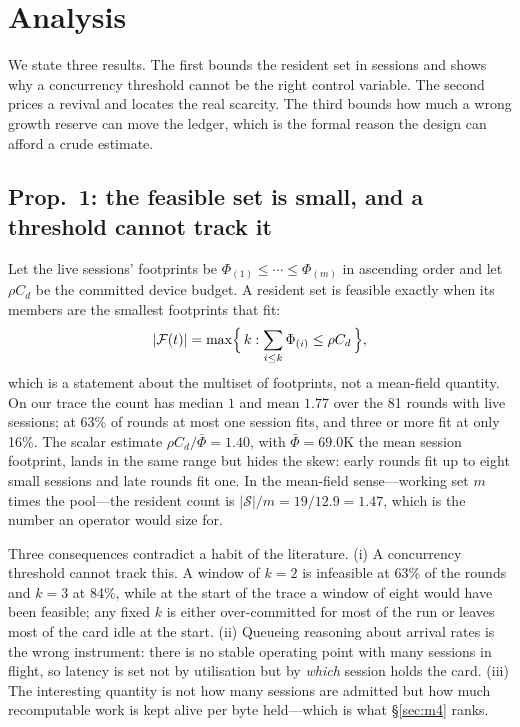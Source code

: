 \section{Analysis}
\label{sec:analysis}

We state three results. The first bounds the resident set in sessions and shows why a
concurrency threshold cannot be the right control variable. The second prices a revival
and locates the real scarcity. The third bounds how much a wrong growth reserve can move
the ledger, which is the formal reason the design can afford a crude estimate.

\subsection{Prop.~1: the feasible set is small, and a threshold cannot track it}

Let the live sessions' footprints be $\Phi_{(1)}\le\cdots\le\Phi_{(m)}$ in ascending order
and let $\rho C_d$ be the committed device budget. A resident set is feasible exactly when
its members are the smallest footprints that fit:
\begin{equation}
|\mathcal{F}(t)|=\max\Bigl\{\,k:\sum_{i\le k}\Phi_{(i)}\le\rho C_d\,\Bigr\},
\label{eq:prop1}
\end{equation}
which is a statement about the multiset of footprints, not a mean-field quantity. On our
trace the count has median $1$ and mean $1.77$ over the 81 rounds with live sessions; at
63\% of rounds at most one session fits, and three or more fit at only 16\%. The scalar
estimate $\rho C_d/\bar\Phi=1.40$, with $\bar\Phi=69.0$K the mean session footprint, lands
in the same range but hides the skew: early rounds fit up to eight small sessions and late
rounds fit one. In the mean-field sense---working set $m$ times the pool---the resident
count is $|\mathcal{S}|/m=19/12.9=1.47$, which is the number an operator would size for.

Three consequences contradict a habit of the literature.
(i) A concurrency threshold cannot track this. A window of $k=2$ is infeasible at 63\% of
the rounds and $k=3$ at 84\%, while at the start of the trace a window of eight would have
been feasible; any fixed $k$ is either over-committed for most of the run or leaves most of
the card idle at the start.
(ii) Queueing reasoning about arrival rates is the wrong instrument: there is no stable
operating point with many sessions in flight, so latency is set not by utilisation but by
\emph{which} session holds the card.
(iii) The interesting quantity is not how many sessions are admitted but how much
recomputable work is kept alive per byte held---which is what \S\ref{sec:m4} ranks.

